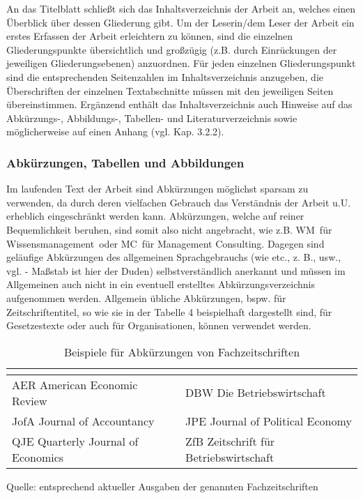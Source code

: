 \documentclass[a4paper, 12pt]{article}
\renewcommand{\arraystretch}{1.0}
\begin{document}
An das Titelblatt schlie\ss t sich das Inhaltsverzeichnis der Arbeit an, welches einen
\"{U}berblick \"{u}ber dessen Gliederung gibt. Um der Leserin/dem Leser der Arbeit ein
erstes Erfassen der Arbeit erleichtern zu k\"{o}nnen, sind die einzelnen
Gliederungspunkte \"{u}bersichtlich und gro\ss z\"{u}gig (z.B. durch Einr\"{u}ckungen der
jeweiligen Gliederungsebenen) anzuordnen. F\"{u}r jeden einzelnen Gliederungspunkt sind
die entsprechenden Seitenzahlen im Inhaltsverzeichnis anzugeben, die \"{U}berschriften
der einzelnen Textabschnitte m\"{u}ssen mit den jeweiligen Seiten \"{u}bereinstimmen.
Erg\"{a}nzend enth\"{a}lt das Inhaltsverzeichnis auch Hinweise auf das Abk\"{u}rzungs-,
Abbildungs-, Tabellen- und Literaturverzeichnis sowie m\"{o}glicherweise auf einen
Anhang (vgl. Kap. 3.2.2).

\subsubsection{Abk\"{u}rzungen, Tabellen und Abbildungen}

Im laufenden Text der Arbeit sind Abk\"{u}rzungen m\"{o}glichst sparsam zu verwenden, da
durch deren vielfachen Gebrauch das Verst\"{a}ndnis der Arbeit u.U. erheblich
eingeschr\"{a}nkt werden kann. Abk\"{u}rzungen, welche auf reiner Bequemlichkeit beruhen,
sind somit also nicht angebracht, wie z.B. \glqq WM\grqq\ f\"{u}r \glqq
Wissensmanagement\grqq\ oder \glqq MC\grqq\ f\"{u}r \glqq Management Consulting\grqq.
Dagegen sind gel\"{a}ufige Abk\"{u}rzungen des allgemeinen Sprachgebrauchs (wie etc., z. B.,
usw., vgl. - Ma\ss stab ist hier der Duden) selbstverst\"{a}ndlich anerkannt und m\"{u}ssen im
Allgemeinen auch nicht in ein eventuell erstelltes Abk\"{u}rzungsverzeichnis aufgenommen
werden. Allgemein \"{u}bliche Abk\"{u}rzungen, bspw. f\"{u}r Zeitschriftentitel, so wie sie in
der Tabelle 4 beispielhaft dargestellt sind, f\"{u}r Gesetzestexte oder auch f\"{u}r
Organisationen, k\"{o}nnen verwendet werden.

\begin{center}
\begin{table}[h] \centering
\renewcommand{\arraystretch}{1.3}
\begin{tabular}{|l|l|}
\multicolumn{1}{c}{\hspace{5cm}} & \multicolumn{1}{c}{\hspace{5cm}}\\ \hline AER
American Economic Review & DBW Die Betriebswirtschaft \\ \hline JofA Journal of
Accountancy & JPE Journal of Political Economy \\ \hline QJE Quarterly Journal of
Economics & ZfB Zeitschrift f\"{u}r Betriebswirtschaft \\ \hline
\end{tabular}
\singlespacing \caption{Beispiele f\"{u}r Abk\"{u}rzungen von
Fachzeitschriften}\label{AbkJournals} {Quelle: entsprechend aktueller Ausgaben der
genannten Fachzeitschriften}
\renewcommand{\arraystretch}{1.3}
\onehalfspacing
\end{table}
\end{center}
\end{document}

